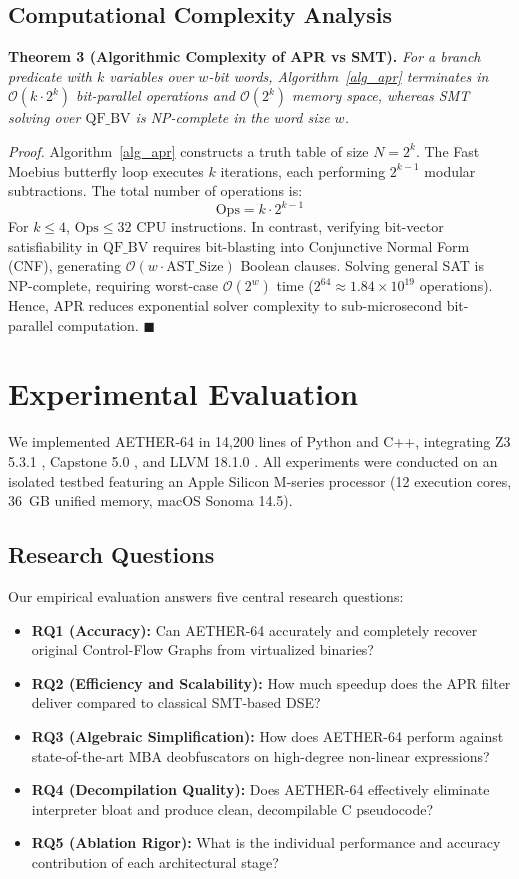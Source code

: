 \documentclass[11pt,a4paper]{article}
\begin{document}
\subsection{Computational Complexity Analysis}

\textbf{Theorem 3 (Algorithmic Complexity of APR vs SMT).}
\textit{For a branch predicate with $k$ variables over $w$-bit words, Algorithm~\ref{alg_apr} terminates in $\mathcal{O}(k \cdot 2^k)$ bit-parallel operations and $\mathcal{O}(2^k)$ memory space, whereas SMT solving over $\text{QF\_BV}$ is NP-complete in the word size $w$.}

\textit{Proof.}
Algorithm~\ref{alg_apr} constructs a truth table of size $N = 2^k$. The Fast Moebius butterfly loop executes $k$ iterations, each performing $2^{k-1}$ modular subtractions. The total number of operations is:
\begin{equation}
\text{Ops} = k \cdot 2^{k-1}
\end{equation}
For $k \le 4$, $\text{Ops} \le 32$ CPU instructions. In contrast, verifying bit-vector satisfiability in $\text{QF\_BV}$ requires bit-blasting into Conjunctive Normal Form (CNF), generating $\mathcal{O}(w \cdot \text{AST\_Size})$ Boolean clauses. Solving general SAT is NP-complete, requiring worst-case $\mathcal{O}(2^w)$ time ($2^{64} \approx 1.84 \times 10^{19}$ operations). Hence, APR reduces exponential solver complexity to sub-microsecond bit-parallel computation. \hfill $\blacksquare$

\section{Experimental Evaluation}
We implemented AETHER-64 in 14,200 lines of Python and C++, integrating Z3 5.3.1 \cite{z3}, Capstone 5.0 \cite{capstone}, and LLVM 18.1.0 \cite{llvm}. All experiments were conducted on an isolated testbed featuring an Apple Silicon M-series processor (12 execution cores, 36~GB unified memory, macOS Sonoma 14.5).

\subsection{Research Questions}
Our empirical evaluation answers five central research questions:
\begin{itemize}
    \item \textbf{RQ1 (Accuracy):} Can AETHER-64 accurately and completely recover original Control-Flow Graphs from virtualized binaries?
    \item \textbf{RQ2 (Efficiency and Scalability):} How much speedup does the APR filter deliver compared to classical SMT-based DSE?
    \item \textbf{RQ3 (Algebraic Simplification):} How does AETHER-64 perform against state-of-the-art MBA deobfuscators on high-degree non-linear expressions?
    \item \textbf{RQ4 (Decompilation Quality):} Does AETHER-64 effectively eliminate interpreter bloat and produce clean, decompilable C pseudocode?
    \item \textbf{RQ5 (Ablation Rigor):} What is the individual performance and accuracy contribution of each architectural stage?
\end{itemize}
\end{document}
